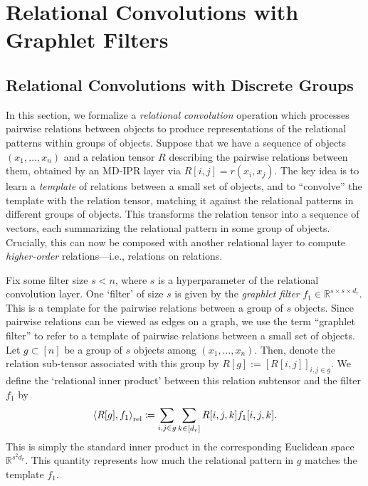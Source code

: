 \section{Relational Convolutions with Graphlet Filters}\label{sec:relconv}

\subsection{Relational Convolutions with Discrete Groups}\label{ssec:relconv_discrete_groups}
In this section, we formalize a \textit{relational convolution} operation which processes pairwise relations between objects to produce representations of the relational patterns within groups of objects. Suppose that we have a sequence of objects $(x_1, \ldots, x_n)$ and a relation tensor $R$ describing the pairwise relations between them, obtained by an MD-IPR layer via $R[i,j] = r(x_i, x_j)$. The key idea is to learn a \textit{template} of relations between a small set of objects, and to ``convolve'' the template with the relation tensor, matching it against the relational patterns in different groups of objects. This transforms the relation tensor into a sequence of vectors, each summarizing the relational pattern in some group of objects. Crucially, this can now be composed with another relational layer to compute \textit{higher-order} relations---i.e., relations on relations.

Fix some filter size $s < n$, where $s$ is a hyperparameter of the relational convolution layer. One `filter' of size $s$ is given by the \textit{graphlet filter} $f_1 \in \mathbb{R}^{s \times s \times d_r}$. This is a template for the pairwise relations between a group of $s$ objects. 
Since pairwise relations can be viewed as edges on a graph, we use the term ``graphlet filter'' to refer to a template of pairwise relations between a small set of objects.
Let $g \subset [n]$ be a group of $s$ objects among $(x_1, \ldots, x_n)$. Then, denote the relation sub-tensor associated with this group by $R[g] := [R[i,j]]_{i,j \in g}$. We define the `relational inner product' between this relation subtensor and the filter $f_1$ by
\begin{equation}\label{eq:relational_inner_prod_one_filt}
    \left\langle R[g], f_1 \right\rangle_\mathrm{rel} \coloneqq \sum_{i,j \in g} \sum_{k \in [d_r]} R[i,j,k] f_1[i,j,k].
\end{equation}
This is simply the standard inner product in the corresponding Euclidean space $\mathbb{R}^{s^2 d_r}$. This quantity represents how much the relational pattern in $g$ matches the template $f_1$.

